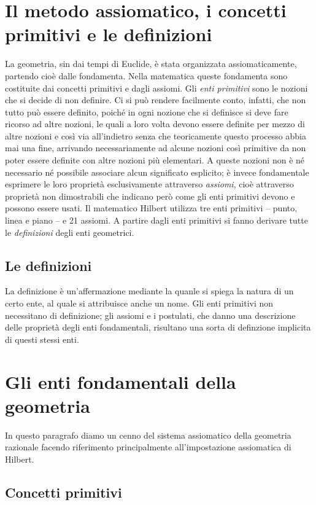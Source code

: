 \section{Il metodo assiomatico, i concetti primitivi e le 
definizioni}\label{sect:metodo_assiomatico_concetti_primitivi}
La geometria, sin dai tempi di Euclide, è stata organizzata 
assiomaticamente, partendo cioè dalle fondamenta. Nella matematica 
queste fondamenta sono costituite dai concetti primitivi e dagli 
assiomi. Gli \emph{enti primitivi} sono le nozioni che si decide di 
non definire. Ci si può rendere facilmente conto, infatti, che non 
tutto può essere definito, poiché in ogni nozione che si definisce si 
deve fare ricorso ad altre nozioni, le quali a loro volta devono 
essere definite per mezzo di altre nozioni e così via all'indietro 
senza che teoricamente questo processo abbia mai una fine, arrivando 
necessariamente ad alcune nozioni così primitive da non poter essere 
definite con altre nozioni più elementari. A queste nozioni non è né 
necessario né possibile associare alcun significato esplicito; è 
invece fondamentale esprimere le loro proprietà esclusivamente 
attraverso \emph{assiomi}, cioè attraverso proprietà non dimostrabili 
che indicano però come gli enti primitivi devono e possono essere 
usati. Il matematico Hilbert utilizza tre enti primitivi -- punto, 
linea e piano -- e 21 assiomi. A partire dagli enti primitivi si 
fanno derivare tutte le \emph{definizioni} degli enti geometrici.

\subsection {Le definizioni}
La definizione è un'affermazione mediante la quanle si spiega la natura di un certo ente, al quale si attribuisce anche un nome. Gli enti primitivi non necessitano di definizione; gli assiomi e i postulati, che danno una descrizione delle proprietà degli enti fondamentali, risultano una sorta di definzione implicita di questi stessi enti.

\section{Gli enti fondamentali della 
geometria}\label{sect:enti_fondamentali}

In questo paragrafo diamo un cenno del sistema assiomatico della 
geometria razionale facendo riferimento principalmente 
all'impostazione assiomatica di Hilbert.

\subsection{Concetti primitivi}

